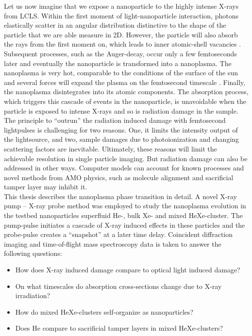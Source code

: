 %
Let us now imagine that we expose a nanoparticle to the highly intense X-rays from LCLS. Within the first moment of light-nanoparticle interaction, photons elastically scatter in an angular distribution distinctive to the shape of the particle that we are able measure in 2D. However, the particle will also absorb the rays from the first moment on, which leads to inner atomic-shell vacancies \citep{Young-2010-Nature}. Subsequent processes, such as the Auger-decay, occur only a few femtoseconds later and eventually the nanoparticle is transformed into a nanoplasma. The nanoplasma is very hot, comparable to the conditions of the surface of the sun and several forces will expand the plasma on the femtosecond timescale \citep{Gorkhover-2016-NatPho}. Finally, the nanoplasma disintegrates into its atomic components. The absorption process, which triggers this cascade of events in the nanoparticle, is unavoidable when the particle is exposed to intense X-rays and so is radiation damage in the sample.\\[1\baselineskip]
%
The principle to ``outrun'' the radiation induced damage with femtosecond lightpulses is challenging for two reasons. One, it limits the intensity output of the lightsource, and two, sample damages due to photoionization and changing scattering factors are inevitable. Ultimately, these reasons will limit the achievable resolution in single particle imaging. But radiation damage can also be addressed in other ways. Computer models can account for known processes \citep{Quiney-2010-NatPhys} and novel methods from AMO physics, such as molecule alignment \citep{Kupper-2014-PRL} and sacrificial tamper layer \citep{Hau-Riege-2004-PRE,Hau-Riege-2010-PRL} may inhibit it.\\[1\baselineskip]
%
This thesis describes the nanoplasma phase transition in detail. A novel X-ray pump -- X-ray probe method was employed to study the nanoplasma evolution in the testbed nanoparticles superfluid He-, bulk Xe- and mixed HeXe-cluster. The pump-pulse initiates a cascade of X-ray induced effects in these particles and the probe-pulse creates a ``snapshot'' at a later time delay. Coincident diffraction imaging and time-of-flight mass spectroscopy data is taken to answer the following questions:
\begin{itemize}
	\item How does X-ray induced damage compare to optical light induced damage?
	\item On what timescales do absorption cross-sections change due to X-ray irradiation?
	\item How do mixed HeXe-clusters self-organize as nanoparticles?
	\item Does He compare to sacrificial tamper layers in mixed HeXe-clusters?
\end{itemize}

